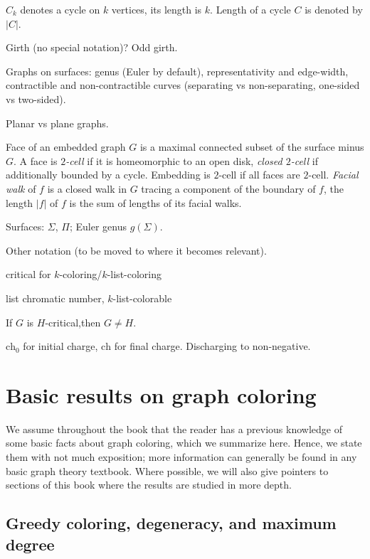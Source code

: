 \documentclass[12pt,twoside,openright,a4paper]{book}
\newcommand{\initch}{\text{ch}_0}
\newcommand{\finch}{\text{ch}}
\begin{document}
$C_k$ denotes a cycle on $k$ vertices, its length is $k$.  Length of a cycle $C$ is denoted by $|C|$.

Girth (no special notation)? Odd girth.

Graphs on surfaces: genus (Euler by default), representativity and edge-width, contractible and
non-contractible curves (separating vs non-separating, one-sided vs two-sided).

Planar vs plane graphs.

Face of an embedded graph $G$ is a maximal connected subset of the surface minus $G$.
A face is \emph{$2$-cell} if it is homeomorphic to an open disk, \emph{closed $2$-cell}
if additionally bounded by a cycle.  Embedding is $2$-cell if all faces are $2$-cell.
\emph{Facial walk} of $f$ is a closed walk in $G$ tracing
a component of the boundary of $f$, the length $|f|$ of $f$ is the sum of lengths of its facial
walks.

Surfaces: $\Sigma$, $\Pi$; Euler genus $g(\Sigma)$.

Other notation (to be moved to where it becomes relevant).

critical for $k$-coloring/$k$-list-coloring

list chromatic number, $k$-list-colorable

If $G$ is $H$-critical,then $G\neq H$.

$\initch$ for initial charge, $\finch$ for final charge.  Discharging to non-negative.

\section{Basic results on graph coloring}

We assume throughout the book that the reader has a previous knowledge of some basic facts
about graph coloring, which we summarize here.  Hence, we state them with not much exposition;
more information can generally be found in any basic graph theory textbook.
Where possible, we will also give pointers to sections of this book where the results are
studied in more depth.

\subsection{Greedy coloring, degeneracy, and maximum degree}
\end{document}
